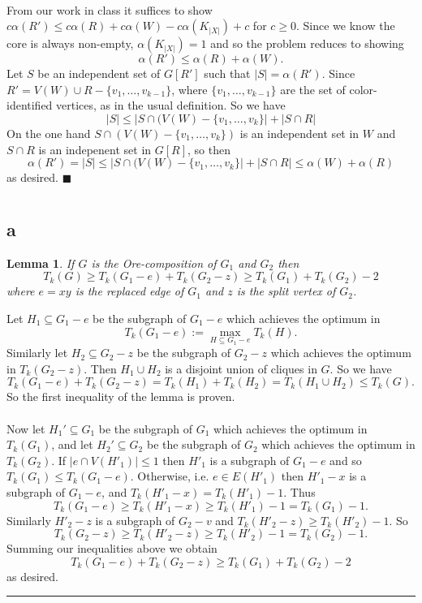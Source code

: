 \documentclass[letterpaper,12pt,oneside,onecolumn]{article}
\newenvironment{proof}{{\bf Proof:  }}{\hfill\rule{2mm}{2mm}}
\newtheorem{lemma}[fact]{Lemma}
\begin{document}
\paragraph{}
From our work in class it suffices to show $c\alpha(R') \leq c\alpha(R) + c\alpha(W) - c\alpha(K_{|X|}) + c$ for $c \geq 0$. Since we know the core is always non-empty, $\alpha(K_{|X|}) = 1$ and so the problem reduces to showing
$$\alpha(R') \leq \alpha(R) + \alpha(W).$$
Let $S$ be an independent set of $G[R']$ such that $|S| = \alpha(R')$. Since $R'= V(W) \cup R - \{v_1, \dots, v_{k-1}\}$, where $\{v_1, \dots, v_{k-1}\}$ are the set of color-identified vertices, as in the usual definition. So we have
$$|S| \leq |S\cap (V(W) - \{v_1, \dots, v_k\}| + |S\cap R|$$
On the one hand $S\cap (V(W) - \{v_1, \dots, v_k\})$ is an independent set in $W$ and $S \cap R$ is an indepenent set in $G[R]$, so then
$$ \alpha(R') = |S| \leq |S\cap (V(W) - \{v_1, \dots, v_k\}| + |S\cap R| \leq \alpha(W) + \alpha(R)$$
as desired. $\blacksquare$
\newpage
\section{}
\subsection{a}
\begin{lemma}
If $G$ is the Ore-composition of $G_1$ and $G_2$ then
$$T_k(G) \geq T_k(G_1-e) + T_k(G_2 - z) \geq T_k(G_1) + T_k(G_2) - 2$$
where $e = xy$ is the replaced edge of $G_1$ and $z$ is the split vertex of $G_2$.
\end{lemma}
\begin{proof}
Let $H_1 \subseteq G_1- e$ be the subgraph of $G_1 - e$ which achieves the optimum in 
$$T_k(G_1-e) := \max_{H \subseteq G_1 - e} T_k(H).$$
Similarly let $H_2 \subseteq G_2 - z$ be the subgraph of $G_2 - z$ which achieves the optimum in $T_k(G_2 - z)$. Then $H_1 \cup H_2$ is a disjoint union of cliques in $G$. So we have
$$T_k(G_1-e) + T_k(G_2 - z) = T_k(H_1) + T_k(H_2) = T_k(H_1 \cup H_2) \leq T_k(G).$$
So the first inequality of the lemma is proven.
\paragraph{}
Now let $H_1' \subseteq G_1$ be the subgraph of $G_1$ which achieves the optimum in $T_k(G_1)$, and let $H_2' \subseteq G_2$ be the subgraph of $G_2$ which achieves the optimum in $T_k(G_2)$. If $|e \cap V(H'_1)| \leq 1$ then $H'_1$ is a subgraph of $G_1 - e$ and so $T_k(G_1) \leq T_k(G_1-e)$. Otherwise, i.e. $ e\in E(H'_1)$ then $H'_1 - x$ is a subgraph of $G_1 - e$, and $T_k(H'_1-x) = T_k(H'_1) - 1$. Thus 
$$T_k(G_1 - e) \geq T_k(H'_1-x) \geq T_k(H'_1) - 1 =T_k(G_1) - 1.$$
Similarly $H'_2 - z$ is a subgraph of $G_2 - v$ and $T_k(H'_2-z) \geq T_k(H'_2) - 1$. So 
$$T_k(G_2 - z) \geq T_k(H'_2 - z) \geq T_k(H'_2) - 1 = T_k(G_2) - 1.$$
Summing our inequalities above we obtain
$$T_k(G_1 - e) + T_k(G_2 - z) \geq T_k(G_1) + T_k(G_2) - 2$$
as desired.
\end{proof}
\end{document}
